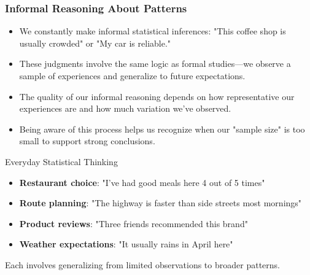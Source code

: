\documentclass{beamer}
\begin{document}
	\begin{frame}
		\frametitle{Informal Reasoning About Patterns}
		
		\begin{itemize}
			\item We constantly make informal statistical inferences: "This coffee shop is usually crowded" or "My car is reliable."
			\item These judgments involve the same logic as formal studies—we observe a sample of experiences and generalize to future expectations.
			\item The quality of our informal reasoning depends on how representative our experiences are and how much variation we've observed.
			\item Being aware of this process helps us recognize when our "sample size" is too small to support strong conclusions.
		\end{itemize}
		
		\begin{block}{Everyday Statistical Thinking}
			\begin{itemize}
				\item \textbf{Restaurant choice}: "I've had good meals here 4 out of 5 times"
				\item \textbf{Route planning}: "The highway is faster than side streets most mornings"
				\item \textbf{Product reviews}: "Three friends recommended this brand"
				\item \textbf{Weather expectations}: "It usually rains in April here"
			\end{itemize}
			Each involves generalizing from limited observations to broader patterns.
		\end{block}
		
	\end{frame}
	
\end{document}
